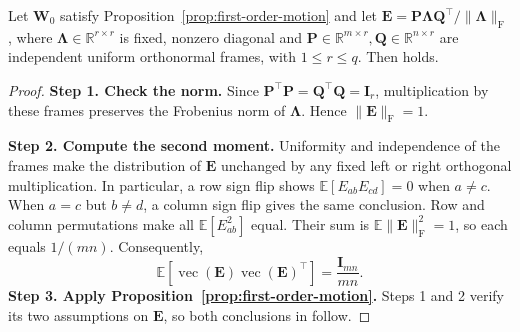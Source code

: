 \begin{corollary}\label{cor:isotropic-fraction}
Let $\bm W_0$ satisfy Proposition~\ref{prop:first-order-motion} and let $\bm E=\bm P\bm\Lambda\bm Q^{\!\top}/\|\bm\Lambda\|_{\mathrm F}$, where $\bm\Lambda\in\mathbb R^{r\times r}$ is fixed, nonzero diagonal and $\bm P\in\mathbb R^{m\times r},\bm Q\in\mathbb R^{n\times r}$ are independent uniform orthonormal frames, with $1\leq r\leq q$. Then  holds.
\end{corollary}
\begin{proof}
\textbf{Step 1. Check the norm.} Since $\bm P^{\!\top}\bm P=\bm Q^{\!\top}\bm Q=\bm I_r$, multiplication by these frames preserves the Frobenius norm of $\bm\Lambda$. Hence $\|\bm E\|_{\mathrm F}=1$.

\textbf{Step 2. Compute the second moment.} Uniformity and independence of the frames make the distribution of $\bm E$ unchanged by any fixed left or right orthogonal multiplication. In particular, a row sign flip shows $\mathbb E[E_{ab}E_{cd}]=0$ when $a\neq c$. When $a=c$ but $b\neq d$, a column sign flip gives the same conclusion. Row and column permutations make all $\mathbb E[E_{ab}^2]$ equal. Their sum is $\mathbb E\|\bm E\|_{\mathrm F}^2=1$, so each equals $1/(mn)$. Consequently,
\begin{equation*}
\mathbb E[\operatorname{vec}(\bm E)\operatorname{vec}(\bm E)^{\!\top}]=\frac{\bm I_{mn}}{mn}.
\end{equation*}
\textbf{Step 3. Apply Proposition~\ref{prop:first-order-motion}.} Steps 1 and 2 verify its two assumptions on $\bm E$, so both conclusions in  follow.
\end{proof}

